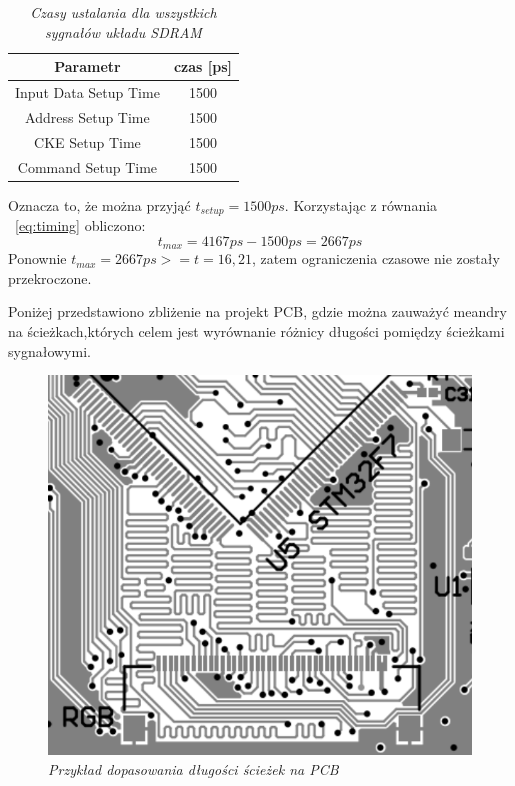 \documentclass[eng,printmode]{mgr}
\begin{document}
\begin{table}[htb]

\caption{\textit{ Czasy ustalania dla wszystkich sygnałów układu SDRAM}}
\label{tab:sdramTiming}
\begin{center}
\begin{tabular}{ |c|c| }
\hline
Parametr  & czas [ps] \\ 
\hline
Input Data Setup Time & 1500 \\ 
\hline
Address Setup Time & 1500\\ 
\hline
CKE Setup Time	 & 1500\\ 
\hline
Command Setup Time	 & 1500\\ 
\hline
\end{tabular}
\end{center}
\end{table}

Oznacza to, że można przyjąć $t_{setup}=1500ps$. Korzystając z równania ~\ref{eq:timing} obliczono:
$$
t_{max} = 4167ps - 1500ps = 2667ps
$$
Ponownie $t_{max}= 2667ps >= t=16,21$, zatem ograniczenia czasowe nie zostały przekroczone.


Poniżej przedstawiono zbliżenie na projekt PCB, gdzie można zauważyć meandry na ścieżkach,których celem jest wyrównanie różnicy długości pomiędzy ścieżkami sygnałowymi.

\begin{figure}[!h]
    \centering
    \includegraphics[width=\textwidth]{pcb/ltdc.png}
    \caption{\textit{\scriptsize Przykład dopasowania długości ścieżek na PCB}}
\end{figure}
\end{document}
